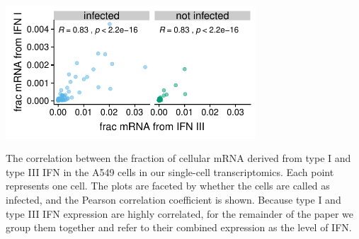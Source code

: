 \documentclass[lineno]{asm-article}
\begin{document}
\begin{suppfig}
\includegraphics[width=0.7\textwidth]{figures/single_cell_figures/p_ifn_genes_corr.pdf}
\caption{
The correlation between the fraction of cellular mRNA derived from type I and type III IFN in the A549 cells in our single-cell transcriptomics.
Each point represents one cell.
The plots are faceted by whether the cells are called as infected, and the Pearson correlation coefficient is shown.
Because type I and type III IFN expression are highly correlated, for the remainder of the paper we group them together and refer to their combined expression as the level of IFN.
}
\label{suppfig:type_I_III_correlation}
\end{suppfig}
\end{document}
